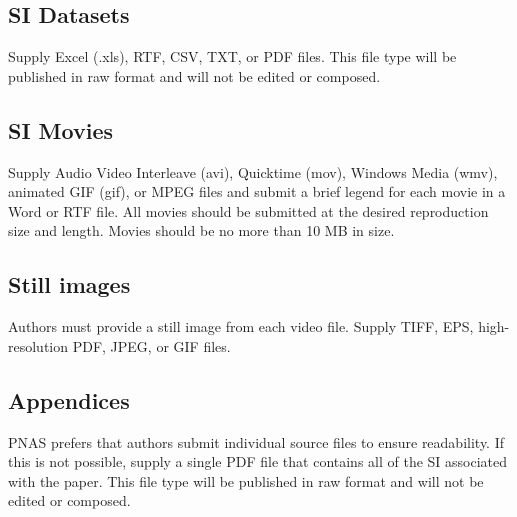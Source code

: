 \documentclass[9pt,twocolumn,twoside]{pnas-new}
\begin{document}
\subsection*{SI Datasets}

Supply Excel (.xls), RTF, CSV, TXT, or PDF files. This file type will be published in raw format and will not be edited or composed. 

\subsection*{SI Movies}

Supply Audio Video Interleave (avi), Quicktime (mov), Windows Media (wmv), animated GIF (gif), or MPEG files and submit a brief legend for each movie in a Word or RTF file. All movies should be submitted at the desired reproduction size and length. Movies should be no more than 10 MB in size. 

\subsection*{Still images}

Authors must provide a still image from each video file. Supply TIFF, EPS, high-resolution PDF, JPEG, or GIF files. 

\subsection*{Appendices}

PNAS prefers that authors submit individual source files to ensure readability. If this is not possible, supply a single PDF file that contains all of the SI associated with the paper. This file type will be published in raw format and will not be edited or composed.

\end{document}
